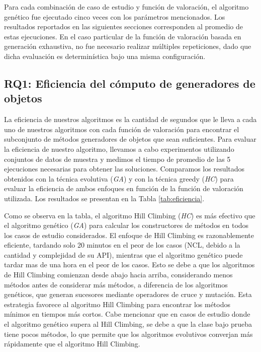 Para cada combinación de caso de estudio y función de valoración, el algoritmo
genético fue ejecutado cinco veces con los parámetros mencionados. Los
resultados reportados en las siguientes secciones corresponden al promedio de
estas ejecuciones. En el caso particular de la función de valoración basada en
generación exhaustiva, no fue necesario realizar múltiples repeticiones, dado
que dicha evaluación es determinística bajo una misma configuración.





\subsection{RQ1: Eficiencia del cómputo de generadores de objetos}


La eficiencia de nuestros algoritmos es la cantidad de segundos que le lleva a cada uno de nuestros algoritmos con cada función de 
valoración para encontrar el subconjunto de métodos generadores de objetos que sean suficientes. Para evaluar la eficiencia de nuestro algoritmo, 
llevamos a cabo experimentos utilizando conjuntos de datos de muestra y medimos el tiempo de promedio de las 5 ejecuciones necesarias 
para obtener las soluciones. Comparamos los resultados obtenidos con la técnica evolutiva (\emph{GA}) y con la técnica greedy (\emph{HC}) 
para evaluar la eficiencia de ambos enfoques en función de la función de valoración utilizada. Los resultados se presentan en la Tabla \ref{tab:eficiencia}.

Como se observa en la tabla, el algoritmo Hill Climbing (\emph{HC}) es más efectivo que el algoritmo genético (\emph{GA}) para calcular los constructores de métodos en todos los casos de estudio considerados. 
El enfoque de Hill Climbing es razonablemente eficiente, tardando solo 20 minutos en el peor de los casos (NCL, debido a la cantidad y complejidad 
de su API), mientras que el algoritmo genético puede tardar mas de una hora en el peor de los casos. Esto se debe a que los algoritmos 
de Hill Climbing comienzan desde abajo hacia arriba, considerando menos métodos antes de considerar más métodos, a diferencia de los 
algoritmos genéticos, que generan sucesores mediante operadores de cruce y mutación. Esta estrategia favorece al algoritmo Hill Climbing 
para encontrar los métodos mínimos en tiempos más cortos. Cabe mencionar que en casos de estudio donde el algoritmo genético supera al 
Hill Climbing, se debe a que la clase bajo prueba tiene pocos métodos, lo que permite que los algoritmos evolutivos converjan más 
rápidamente que el algoritmo Hill Climbing.


